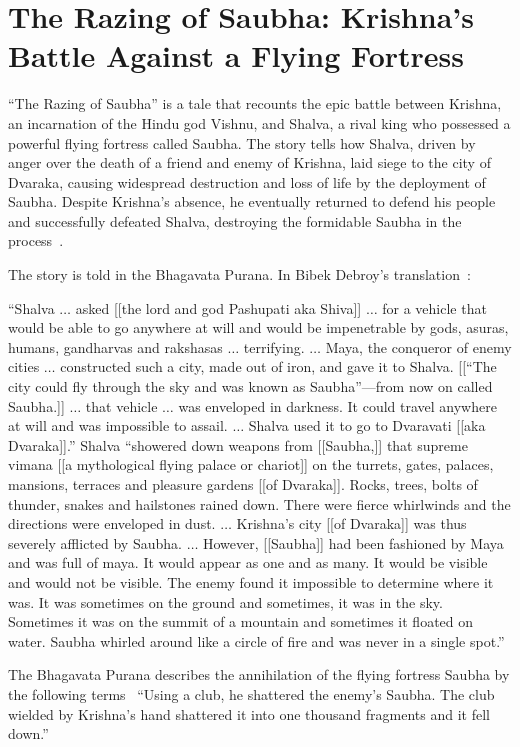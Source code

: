 \section{The Razing of Saubha: Krishna's Battle Against a Flying Fortress}
\label{2023-UFO-part-History-chapter-pre-1945-Saubha}

``The Razing of Saubha'' is a tale that recounts the epic battle between Krishna,
an incarnation of the Hindu god Vishnu,
and Shalva, a rival king who possessed a powerful flying fortress called Saubha.
The story tells how Shalva, driven by anger over the death of a friend and enemy of Krishna,
laid siege to the city of Dvaraka, causing widespread destruction and loss of life by the deployment of Saubha.
Despite Krishna's absence, he eventually returned to defend his people and successfully defeated Shalva,
destroying the formidable Saubha in the process~\cite{vanBuitenen1975,DebroyBhagavataPurana3}.


The story is told in the Bhagavata Purana. In Bibek Debroy's translation~\cite[Chapter~10(76)]{DebroyBhagavataPurana3}:
\begin{svgraybox}
``Shalva $\ldots$ asked [[the lord and god Pashupati aka Shiva]] $\ldots$  for a vehicle that would be able to go anywhere at will and would be impenetrable by gods,
asuras, humans, gandharvas and rakshasas $\ldots$   terrifying.
$\ldots$
Maya, the conqueror of enemy cities $\ldots$
constructed such a city, made out of iron, and gave it to Shalva. [[``The city could fly through the sky and was known as Saubha''---from now on called Saubha.]]
$\ldots$ that vehicle $\ldots$ was enveloped in darkness. It could travel anywhere at will and was impossible to assail.
$\ldots$ Shalva used it to go to Dvaravati [[aka Dvaraka]].''
Shalva ``showered down weapons from [[Saubha,]] that supreme vimana [[a mythological flying palace or chariot]]
on the turrets, gates, palaces, mansions, terraces and pleasure gardens [[of Dvaraka]]. Rocks, trees, bolts of thunder, snakes and hailstones rained down.
There were fierce whirlwinds and the directions were enveloped in dust.
$\ldots$  Krishna's city [[of Dvaraka]] was thus severely afflicted by Saubha.   $\ldots$
However, [[Saubha]]
had been fashioned by Maya and was full of maya. It would appear as one and as many.
 It would be visible and would not be visible. The enemy found it impossible to determine where it was.
It was sometimes on the ground and sometimes, it was in the sky.
Sometimes it was on the summit of a mountain and sometimes it floated
on water. Saubha whirled around like a circle of fire and was never in a single spot.''
\end{svgraybox}
The Bhagavata Purana describes the annihilation of the flying fortress Saubha by the following terms~\cite[Chapter~10(77)]{DebroyBhagavataPurana3}
``Using a club, he shattered the enemy's Saubha. The club wielded by Krishna's hand shattered it into one thousand fragments and it fell down.''




